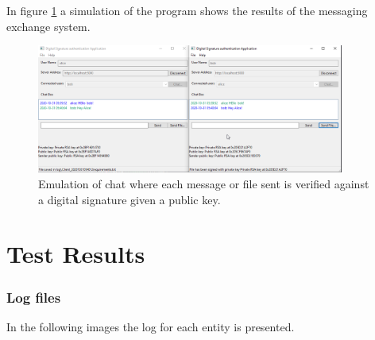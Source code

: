 \documentclass[letterpaper,12pt]{article}
\begin{document}
In figure \ref{fig:CRP_CHAT} a simulation of the program shows the results of the messaging exchange system.

\begin{figure}[H]
    \centering
    \includegraphics[width=0.9\textwidth]{assets/CryptoChat.png}
    \caption{Emulation of chat where each message or file sent is verified against a digital signature given a public key.}
    \label{fig:CRP_CHAT}
\end{figure}

\section{Test Results}
\subsubsection{Log files}
In the following images the log for each entity is presented.
\end{document}
